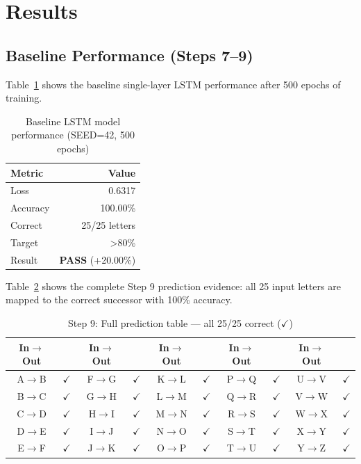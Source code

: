 \documentclass[12pt,a4paper]{article}
\begin{document}
\section{Results}

\subsection{Baseline Performance (Steps 7--9)}

Table~\ref{tab:baseline} shows the baseline single-layer LSTM performance after 500
epochs of training.

\begin{table}[H]
  \centering
  \caption{Baseline LSTM model performance (SEED=42, 500 epochs)}
  \label{tab:baseline}
  \begin{tabular}{lr}
    \toprule
    \textbf{Metric} & \textbf{Value} \\
    \midrule
    Loss     & 0.6317 \\
    Accuracy & 100.00\% \\
    Correct  & 25/25 letters \\
    Target   & >80\% \\
    Result   & \textbf{PASS} (+20.00\%) \\
    \bottomrule
  \end{tabular}
\end{table}

Table~\ref{tab:step9} shows the complete Step 9 prediction evidence: all 25 input letters
are mapped to the correct successor with 100\% accuracy.

\begin{table}[H]
  \centering
  \small
  \caption{Step 9: Full prediction table --- all 25/25 correct ($\checkmark$)}
  \label{tab:step9}
  \begin{tabular}{cc cc cc cc cc}
    \toprule
    \textbf{In$\to$Out} & & \textbf{In$\to$Out} & & \textbf{In$\to$Out} & & \textbf{In$\to$Out} & & \textbf{In$\to$Out} & \\
    \midrule
    A$\to$B & $\checkmark$ & F$\to$G & $\checkmark$ & K$\to$L & $\checkmark$ & P$\to$Q & $\checkmark$ & U$\to$V & $\checkmark$ \\
    B$\to$C & $\checkmark$ & G$\to$H & $\checkmark$ & L$\to$M & $\checkmark$ & Q$\to$R & $\checkmark$ & V$\to$W & $\checkmark$ \\
    C$\to$D & $\checkmark$ & H$\to$I & $\checkmark$ & M$\to$N & $\checkmark$ & R$\to$S & $\checkmark$ & W$\to$X & $\checkmark$ \\
    D$\to$E & $\checkmark$ & I$\to$J & $\checkmark$ & N$\to$O & $\checkmark$ & S$\to$T & $\checkmark$ & X$\to$Y & $\checkmark$ \\
    E$\to$F & $\checkmark$ & J$\to$K & $\checkmark$ & O$\to$P & $\checkmark$ & T$\to$U & $\checkmark$ & Y$\to$Z & $\checkmark$ \\
    \bottomrule
  \end{tabular}
\end{table}
\end{document}
